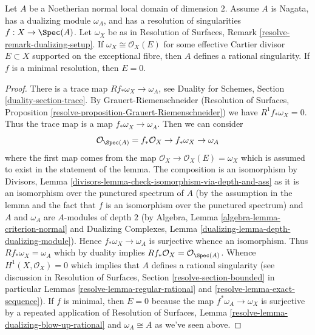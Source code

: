 \begin{lemma}
\label{lemma-characterize-rational-singularity}
Let $A$ be a Noetherian normal local domain of dimension $2$.
Assume $A$ is Nagata, has a dualizing module $\omega_A$, and has a
resolution of singularities $f : X \to \Spec(A)$.
Let $\omega_X$ be as in Resolution of Surfaces,
Remark \ref{resolve-remark-dualizing-setup}.
If $\omega_X \cong \mathcal{O}_X(E)$ for some effective
Cartier divisor $E \subset X$ supported on the exceptional
fibre, then $A$ defines a rational singularity.
If $f$ is a minimal resolution, then $E = 0$.
\end{lemma}

\begin{proof}
There is a trace map $Rf_*\omega_X \to \omega_A$, see
Duality for Schemes, Section \ref{duality-section-trace}.
By Grauert-Riemenschneider
(Resolution of Surfaces,
Proposition \ref{resolve-proposition-Grauert-Riemenschneider})
we have $R^1f_*\omega_X = 0$.
Thus the trace map is a map $f_*\omega_X \to \omega_A$.
Then we can consider
$$
\mathcal{O}_{\Spec(A)} = f_*\mathcal{O}_X \to f_*\omega_X \to \omega_A
$$
where the first map comes from the map
$\mathcal{O}_X \to \mathcal{O}_X(E) = \omega_X$ which is
assumed to exist in the statement of the lemma.
The composition is an isomorphism by Divisors, Lemma
\ref{divisors-lemma-check-isomorphism-via-depth-and-ass}
as it is an isomorphism over the punctured spectrum of $A$
(by the assumption in the lemma and the fact that $f$ is an isomorphism
over the punctured spectrum) and $A$ and $\omega_A$
are $A$-modules of depth $2$ (by
Algebra, Lemma \ref{algebra-lemma-criterion-normal} and
Dualizing Complexes, Lemma \ref{dualizing-lemma-depth-dualizing-module}).
Hence $f_*\omega_X \to \omega_A$ is surjective whence an isomorphism.
Thus $Rf_*\omega_X = \omega_A$ which by duality implies
$Rf_*\mathcal{O}_X = \mathcal{O}_{\Spec(A)}$.
Whence $H^1(X, \mathcal{O}_X) = 0$ which implies that $A$
defines a rational singularity (see discussion in
Resolution of Surfaces, Section
\ref{resolve-section-bounded} in particular
Lemmas \ref{resolve-lemma-regular-rational} and
\ref{resolve-lemma-exact-sequence}).
If $f$ is minimal, then $E = 0$ because the map
$f^*\omega_A \to \omega_X$ is surjective by
a repeated application of Resolution of Surfaces, Lemma
\ref{resolve-lemma-dualizing-blow-up-rational}
and $\omega_A \cong A$ as we've seen above.
\end{proof}